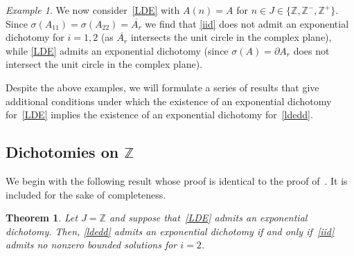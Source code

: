 \documentclass[11pt,reqno,a4paper]{amsart}
\theoremstyle{plain}
\numberwithin{equation}{section}
\newtheorem{theorem}{Theorem}
\theoremstyle{remark}
\newtheorem{example}{Example}
\def\Z{\mathbb{Z}}
\begin{document}
\begin{example}
We now consider~\eqref{LDE} with $A(n)=A$ for $n\in J\in \{\Z, \Z^-, \Z^+\}$. Since $\sigma(A_{11})=\sigma(A_{22})=\overline{A_r}$ we find that \eqref{iid} does not admit an exponential dichotomy for $i=1,2$ (as $\overline{A_r}$ intersects the unit circle in the complex plane), while \eqref{LDE} admits an exponential dichotomy (since $\sigma(A)=\partial A_r$ does not intersect the unit circle in the complex plane). 

 \end{example}

Despite the above examples, we will formulate a series of results that give additional conditions under which the existence of an exponential dichotomy for~\eqref{LDE} implies the existence of an exponential dichotomy for~\eqref{ldedd}.

\subsection{Dichotomies on $\Z$}
We begin with the following result whose proof is identical to the proof of~\cite[Theorem 6]{DP}. It is included for the sake of completeness. 
\begin{theorem}\label{tconv1}
Let $J=\Z$ and suppose that~\eqref{LDE} admits an exponential dichotomy. Then, \eqref{ldedd} admits an exponential dichotomy if and only if~\eqref{iid} admits no nonzero bounded solutions for $i=2$. 
\end{theorem}
\end{document}

